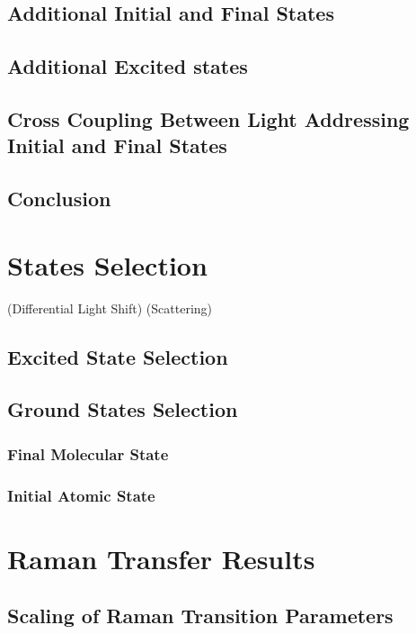 \subsection{Additional Initial and Final States}

\subsection{Additional Excited states}

\subsection{Cross Coupling Between Light Addressing Initial and Final States}

\subsection{Conclusion}

\section{States Selection}
\label{ch:raman-transfer:state-selction}

(Differential Light Shift)
(Scattering)

\subsection{Excited State Selection}

\subsection{Ground States Selection}

\subsubsection{Final Molecular State}

\subsubsection{Initial Atomic State}

\section{Raman Transfer Results}

\subsection{Scaling of Raman Transition Parameters}
